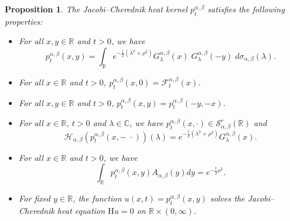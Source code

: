 \documentclass[10pt,a4paper]{amsart}
\newtheorem{proposition}{Proposition}
\def \H{{\mathcal H}}
\def \R{{\mathbb R}}
\def \S{{\mathcal S}}
\begin{document}
\begin{proposition}\label{pro3}
The Jacobi--Cherednik heat kernel $p_t^{\alpha, \beta}$ satisfies the following properties:
\begin{itemize}
\item[(a)] For all $x, y \in \R$ and $t>0$, we have
\begin{equation}\label{eq3}
p_t^{\alpha, \beta}(x, y)= \int_{\mathbb{R}} e^{-\frac{t}{2}\left( \lambda^2+\rho^2\right)}  G^{\alpha, \beta}_\lambda(x)\;  G^{\alpha, \beta}_\lambda(-y) \; d\sigma_{\alpha, \beta}(\lambda).
\end{equation}

\item[(b)] For all $x \in \R$ and $t>0$, $p_t^{\alpha, \beta}(x, 0) = \mathcal{F}_t^{\alpha, \beta}(x)$. 

\item[(c)] For all $x, y \in \R$ and $t>0$, $p_t^{\alpha, \beta}(x, y)=p_t^{\alpha, \beta}(-y, -x)$.

\item[(d)] For all $x \in \R$, $t>0$ and $\lambda \in \mathbb{C}$, we have $p_t^{\alpha, \beta}(x, \cdot) \in \S^r_{\alpha, \beta} (\mathbb{R})$ and 
\[ \H_{\alpha, \beta} \left( p_t^{\alpha, \beta}(x, - \; \cdot) \right) (\lambda) = e^{-\frac{t}{2}\left( \lambda^2+\rho^2\right)} G^{\alpha, \beta}_\lambda(x). \] 

\item[(e)] For all $x \in \R$ and $t>0$, we have
\begin{equation}\label{eq4}
\int_{\R} p_t^{\alpha, \beta}(x, y) A_{\alpha, \beta} (y) dy = e^{-\frac{t}{2} \rho^2}.
\end{equation}

\item[(f)] For fixed $y \in \R$, the function $u(x, t) = p_t^{\alpha, \beta}(x, y)$ solves the Jacobi--Cherednik heat equation $\mathrm{H} u=0$ on $\R \times (0, \infty)$.
\end{itemize}
\end{proposition}
\end{document}
